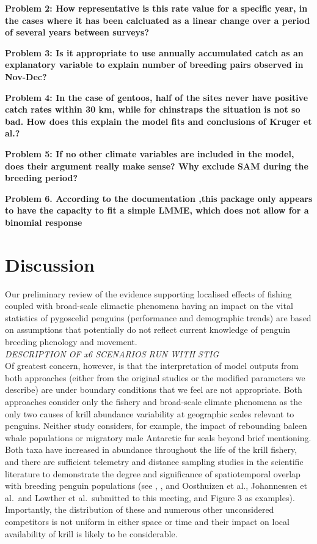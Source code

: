 \documentclass[]{elsarticle} %
\begin{document}
\textbf{Problem 2: How representative is this rate value for a specific
year, in the cases where it has been calcluated as a linear change over
a period of several years between surveys?}

\textbf{Problem 3: Is it appropriate to use annually accumulated catch
as an explanatory variable to explain number of breeding pairs observed
in Nov-Dec?}

\textbf{Problem 4: In the case of gentoos, half of the sites never have
positive catch rates within 30 km, while for chinstraps the situation is
not so bad. How does this explain the model fits and conclusions of
Kruger et al.?}

\textbf{Problem 5: If no other climate variables are included in the
model, does their argument really make sense? Why exclude SAM during the
breeding period?}

\textbf{Problem 6. According to the documentation ,this package only
appears to have the capacity to fit a simple LMME, which does not allow
for a binomial response}

\section{Discussion}\label{discussion}

Our preliminary review of the evidence supporting localised effects of
fishing coupled with broad-scale climactic phenomena having an impact on
the vital statistics of pygoscelid penguins (performance and demographic
trends) are based on assumptions that potentially do not reflect current
knowledge of penguin breeding phenology and movement.\\
\newline \emph{DESCRIPTION OF x6 SCENARIOS RUN WITH STIG}\\
\newline   Of greatest concern, however, is that the interpretation of
model outputs from both approaches (either from the original studies or
the modified parameters we describe) are under boundary conditions that
we feel are not appropriate. Both approaches consider only the fishery
and broad-scale climate phenomena as the only two causes of krill
abundance variability at geographic scales relevant to penguins. Neither
study considers, for example, the impact of rebounding baleen whale
populations or migratory male Antarctic fur seals beyond brief
mentioning. Both taxa have increased in abundance throughout the life of
the krill fishery, and there are sufficient telemetry and distance
sampling studies in the scientific literature to demonstrate the degree
and significance of spatiotemporal overlap with breeding penguin
populations (see \citet{Santora2013}, \citet{Lowther2020}, and
Oosthuizen et al., Johannessen et al.~and Lowther et al.~submitted to
this meeting, and Figure 3 as examples). Importantly, the distribution
of these and numerous other unconsidered competitors is not uniform in
either space or time and their impact on local availability of krill is
likely to be considerable.
\end{document}
